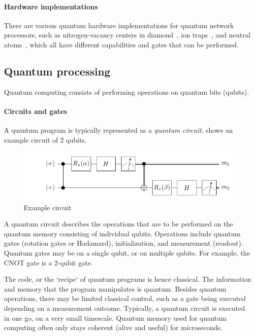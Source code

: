 \paragraph{Hardware implementations}
There are various quantum hardware implementations for quantum network processors, such as nitrogen-vacancy centers in diamond~\cite{Bernien2014}, ion traps~\cite{moehring2007entanglement}, and neutral atoms~\cite{hofmann2012heralded,ritter2012elementary}, which all have different capabilities and gates that can be performed.

\subsection{Quantum processing}
Quantum computing consists of performing operations on quantum bits (qubits).

\paragraph{Circuits and gates}
A quantum program is typically represented as a \emph{quantum circuit}.
 shows an example circuit of 2 qubits.

\begin{figure}[t]
    \centering
    \includegraphics[width=0.8\linewidth]{figures/background/example_circuit.pdf}
    \caption{
      Example circuit 
    }
    \label{fig:example_circuit}
\end{figure}


A quantum circuit describes the operations that are to be performed on the quantum memory consisting of individual qubits.
Operations include quantum gates (rotation gates or Hadamard), initialization, and measurement (readout).
Quantum gates may be on a single qubit, or on multiple qubits.
For example, the CNOT gate is a 2-qubit gate.

The code, or the `recipe` of quantum programs is hence classical.
The information and memory that the program manipulates is quantum.
Besides quantum operations, there may be limited classical control, such as a gate being executed depending on a measurement outcome.
Typically, a quantum circuit is executed in one go, on a very small timescale.
Quantum memory used for quantum computing  often only stays coherent (alive and useful) for microseconds.

